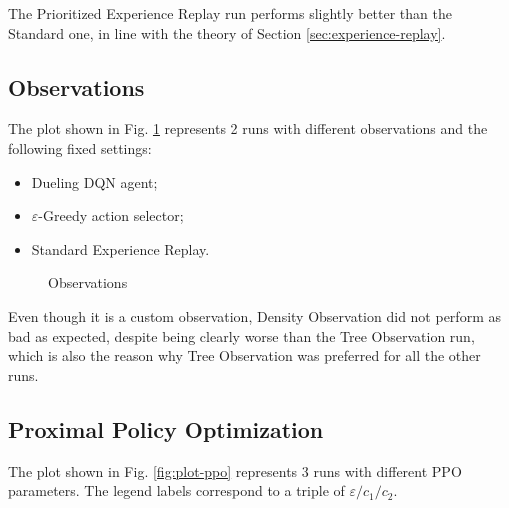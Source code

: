 \documentclass[a4paper, 12pt]{article}
\numberwithin{equation}{section}
\begin{document}
The Prioritized Experience Replay run performs slightly better than the Standard one, in line with the theory of Section \ref{sec:experience-replay}.

\clearpage
\subsection{Observations}

The plot shown in Fig. \ref{fig:plot-observations} represents 2 runs with different observations and the following fixed settings:
\begin{itemize}
	\item Dueling DQN agent;
	\item $\varepsilon$-Greedy action selector;
	\item Standard Experience Replay.
\end{itemize}

\begin{figure}[H]
	\centering
		\caption{Observations}
	\label{fig:plot-observations}
\end{figure}

Even though it is a custom observation, Density Observation did not perform as bad as expected, despite being clearly worse than the Tree Observation run, which is also the reason why Tree Observation was preferred for all the other runs.

\clearpage
\subsection{Proximal Policy Optimization}

The plot shown in Fig. \ref{fig:plot-ppo} represents 3 runs with different PPO parameters. The legend labels correspond to a triple of $\varepsilon/c_1/c_2$.
\end{document}
